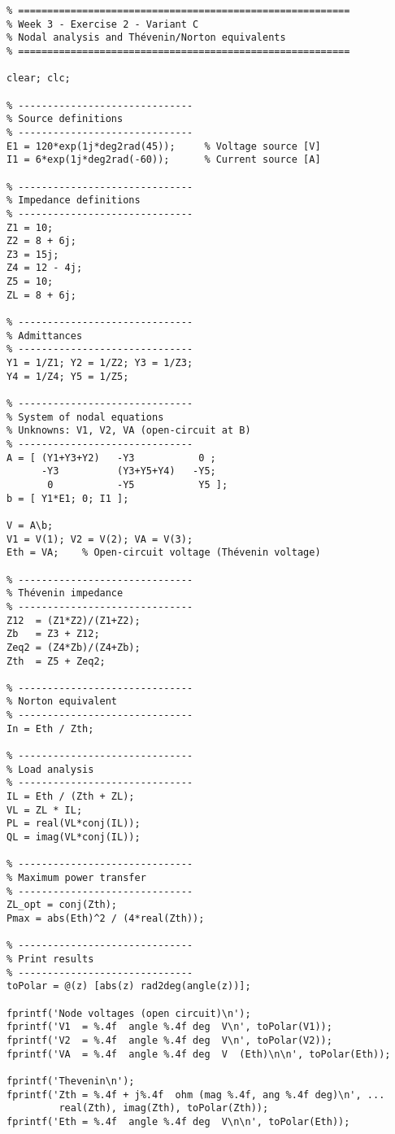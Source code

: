 \documentclass[a4paper,12pt]{article}
\begin{document}
\begin{verbatim}
% =========================================================
% Week 3 - Exercise 2 - Variant C
% Nodal analysis and Thévenin/Norton equivalents
% =========================================================

clear; clc;

% ------------------------------
% Source definitions
% ------------------------------
E1 = 120*exp(1j*deg2rad(45));     % Voltage source [V]
I1 = 6*exp(1j*deg2rad(-60));      % Current source [A]

% ------------------------------
% Impedance definitions
% ------------------------------
Z1 = 10;
Z2 = 8 + 6j;
Z3 = 15j;
Z4 = 12 - 4j;
Z5 = 10;
ZL = 8 + 6j;

% ------------------------------
% Admittances
% ------------------------------
Y1 = 1/Z1; Y2 = 1/Z2; Y3 = 1/Z3;
Y4 = 1/Z4; Y5 = 1/Z5;

% ------------------------------
% System of nodal equations
% Unknowns: V1, V2, VA (open-circuit at B)
% ------------------------------
A = [ (Y1+Y3+Y2)   -Y3           0 ;
      -Y3          (Y3+Y5+Y4)   -Y5;
       0           -Y5           Y5 ];
b = [ Y1*E1; 0; I1 ];

V = A\b;
V1 = V(1); V2 = V(2); VA = V(3);
Eth = VA;    % Open-circuit voltage (Thévenin voltage)

% ------------------------------
% Thévenin impedance
% ------------------------------
Z12  = (Z1*Z2)/(Z1+Z2);
Zb   = Z3 + Z12;
Zeq2 = (Z4*Zb)/(Z4+Zb);
Zth  = Z5 + Zeq2;

% ------------------------------
% Norton equivalent
% ------------------------------
In = Eth / Zth;

% ------------------------------
% Load analysis
% ------------------------------
IL = Eth / (Zth + ZL);
VL = ZL * IL;
PL = real(VL*conj(IL));
QL = imag(VL*conj(IL));

% ------------------------------
% Maximum power transfer
% ------------------------------
ZL_opt = conj(Zth);
Pmax = abs(Eth)^2 / (4*real(Zth));

% ------------------------------
% Print results
% ------------------------------
toPolar = @(z) [abs(z) rad2deg(angle(z))];

fprintf('Node voltages (open circuit)\n');
fprintf('V1  = %.4f  angle %.4f deg  V\n', toPolar(V1));
fprintf('V2  = %.4f  angle %.4f deg  V\n', toPolar(V2));
fprintf('VA  = %.4f  angle %.4f deg  V  (Eth)\n\n', toPolar(Eth));

fprintf('Thevenin\n');
fprintf('Zth = %.4f + j%.4f  ohm (mag %.4f, ang %.4f deg)\n', ...
         real(Zth), imag(Zth), toPolar(Zth));
fprintf('Eth = %.4f  angle %.4f deg  V\n\n', toPolar(Eth));


\end{verbatim}
\end{document}
